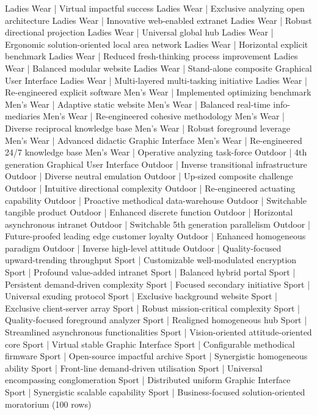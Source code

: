 \begin{pseudo*}
 Ladies Wear | Virtual impactful success
 Ladies Wear | Exclusive analyzing open architecture
 Ladies Wear | Innovative web-enabled extranet
 Ladies Wear | Robust directional projection
 Ladies Wear | Universal global hub
 Ladies Wear | Ergonomic solution-oriented local area network
 Ladies Wear | Horizontal explicit benchmark
 Ladies Wear | Reduced fresh-thinking process improvement
 Ladies Wear | Balanced modular website
 Ladies Wear | Stand-alone composite Graphical User Interface
 Ladies Wear | Multi-layered multi-tasking initiative
 Ladies Wear | Re-engineered explicit software
 Men's Wear  | Implemented optimizing benchmark
 Men's Wear  | Adaptive static website
 Men's Wear  | Balanced real-time info-mediaries
 Men's Wear  | Re-engineered cohesive methodology
 Men's Wear  | Diverse reciprocal knowledge base
 Men's Wear  | Robust foreground leverage
 Men's Wear  | Advanced didactic Graphic Interface
 Men's Wear  | Re-engineered 24/7 knowledge base
 Men's Wear  | Operative analyzing task-force
 Outdoor     | 4th generation Graphical User Interface
 Outdoor     | Inverse transitional infrastructure
 Outdoor     | Diverse neutral emulation
 Outdoor     | Up-sized composite challenge
 Outdoor     | Intuitive directional complexity
 Outdoor     | Re-engineered actuating capability
 Outdoor     | Proactive methodical data-warehouse
 Outdoor     | Switchable tangible product
 Outdoor     | Enhanced discrete function
 Outdoor     | Horizontal asynchronous intranet
 Outdoor     | Switchable 5th generation parallelism
 Outdoor     | Future-proofed leading edge customer loyalty
 Outdoor     | Enhanced homogeneous paradigm
 Outdoor     | Inverse high-level attitude
 Outdoor     | Quality-focused upward-trending throughput
 Sport       | Customizable well-modulated encryption
 Sport       | Profound value-added intranet
 Sport       | Balanced hybrid portal
 Sport       | Persistent demand-driven complexity
 Sport       | Focused secondary initiative
 Sport       | Universal exuding protocol
 Sport       | Exclusive background website
 Sport       | Exclusive client-server array
 Sport       | Robust mission-critical complexity
 Sport       | Quality-focused foreground analyzer
 Sport       | Realigned homogeneous hub
 Sport       | Streamlined asynchronous functionalities
 Sport       | Vision-oriented attitude-oriented core
 Sport       | Virtual stable Graphic Interface
 Sport       | Configurable methodical firmware
 Sport       | Open-source impactful archive
 Sport       | Synergistic homogeneous ability
 Sport       | Front-line demand-driven utilisation
 Sport       | Universal encompassing conglomeration
 Sport       | Distributed uniform Graphic Interface
 Sport       | Synergistic scalable capability
 Sport       | Business-focused solution-oriented moratorium
(100 rows)
\end{pseudo*}

